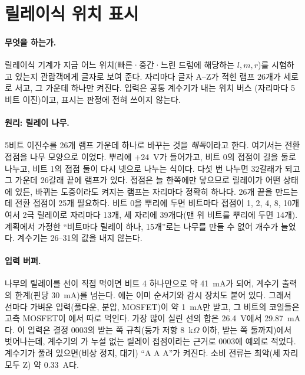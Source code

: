 
\section{릴레이식 위치 표시}\label{sch:relay-position-display}

\paragraph{무엇을 하는가.} 릴레이식 기계가 지금 어느 위치(빠른·중간·느린 드럼에 해당하는 $l, m, r$)를 시험하고
있는지 관람객에게 글자로 보여 준다. 자리마다 글자 A--Z가 적힌 램프 26개가 세로로 서고, 그 가운데 하나만 켜진다.
입력은 공통 계수기가 내는 위치 버스 (자리마다 5비트 이진)이고, 표시는 판정에 전혀 쓰이지 않는다.

\paragraph{원리: 릴레이 나무.} 5비트 이진수를 26개 램프 가운데 하나로 바꾸는 것을 \emph{해독}이라고 한다. 여기서는
전환 접점을 나무 모양으로 이었다. 뿌리에 +24~V가 들어가고, 비트 0의 접점이 길을 둘로 나누고, 비트 1의 접점 둘이
다시 넷으로 나누는 식이다. 다섯 번 나누면 32갈래가 되고 그 가운데 26갈래 끝에 램프가 있다. 접점은 늘 한쪽에만 닿으므로
릴레이가 어떤 상태에 있든, 바뀌는 도중이라도 켜지는 램프는 자리마다 정확히 하나다. 26개 끝을 만드는 데 전환 접점이
25개 필요하다. 비트 0을 뿌리에 두면 비트마다 접점이 1, 2, 4, 8, 10개여서 2극 릴레이로 자리마다 13개, 세 자리에
39개다(맨 위 비트를 뿌리에 두면 14개). 계획에서 가정한 ``비트마다 릴레이 하나, 15개''로는 나무를 만들 수 없어 개수가
늘었다. 계수기는 26--31의 값을 내지 않는다.

\paragraph{입력 버퍼.} 나무의 릴레이를  선이 직접 먹이면 비트 4 하나만으로 약 41~mA가 되어, 계수기 출력의
한계(핀당 30~mA)를 넘는다. 에는 이미 순서기와 감시 장치도 붙어 있다. 그래서 선마다 가벼운 입력(풀다운,
분압, MOSFET)이 약 1~mA만 받고, 그 비트의 코일들은 고측 MOSFET이 에서 따로 먹인다. 가장 많이 실린 선의
합은 26.4~V에서 29.87~mA다. 이 입력은 결정 0003의 받는 쪽 규칙(등가 저항 8~k$\Omega$ 이하, 받는 쪽 둘까지)에서 벗어나는데,
계수기의 가 누설 없는 릴레이 접점이라는 근거로 0003에 예외로 적었다. 계수기가 풀려 있으면(비상 정지, 대기)
``A A A''가 켜진다. 소비 전류는 최악(세 자리 모두 Z) 약 0.33~A다.

